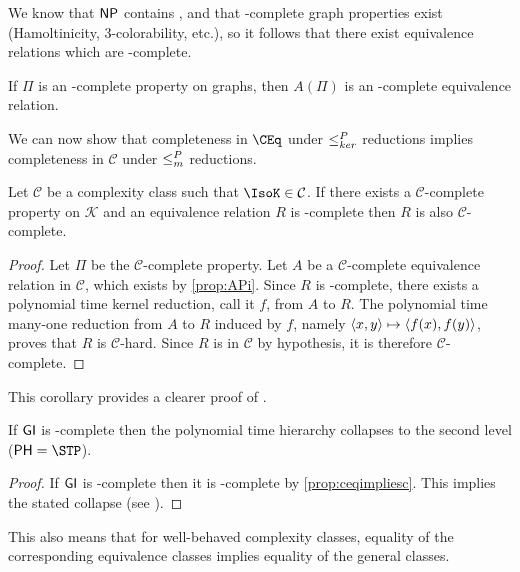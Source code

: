 We know that ${\mathsf{NP}}$ contains \GI, and that \NP-complete graph properties exist (Hamoltinicity, 3-colorability, etc.), so it follows that there exist equivalence relations which are \NP-complete.

\begin{corollary}\label{cor:npcompleteeqrel}
  If $\Pi$ is an \NP-complete property on graphs, then $A(\Pi)$ is an \NP-complete equivalence relation.
\end{corollary}

We can now show that completeness in $\CEq$ under $\leq^{P}_{ker}$ reductions implies completeness in $\mathcal{C}$ under $\leq^{P}_{m}$ reductions.

\begin{proposition}\label{prop:ceqimpliesc}
  Let $\mathcal{C}$ be a complexity class such that $\IsoK\in\mathcal{C}$.
  If there exists a $\mathcal{C}$-complete property on $\mathcal{K}$ and an equivalence relation $R$ is \CEq-complete then $R$ is also $\mathcal{C}$-complete.
\end{proposition}
\begin{proof}
  Let $\Pi$ be the $\mathcal{C}$-complete property.
  Let $A$ be a $\mathcal{C}$-complete equivalence relation in $\mathcal{C}$, which exists by \autoref{prop:APi}.
  Since $R$ is \CEq-complete, there exists a polynomial time kernel reduction, call it $f$, from $A$ to $R$.
  The polynomial time many-one reduction from $A$ to $R$ induced by $f$, namely $\left\langle x,y\right\rangle\mapsto\left\langle f(x),f(y)\right\rangle$, proves that $R$ is $\mathcal{C}$-hard.
  Since $R$ is in $\mathcal{C}$ by hypothesis, it is therefore $\mathcal{C}$-complete.
\end{proof}

This corollary provides a clearer proof of \autocite[Proposition~8.1]{bcffm}.

\begin{corollary}
  If ${\mathsf{GI}}$ is \NPEq-complete then the polynomial time hierarchy collapses to the second level ($\PH=\STP$).
\end{corollary}
\begin{proof}
  If ${\mathsf{GI}}$ is \NPEq-complete then it is \NP-complete by \autoref{prop:ceqimpliesc}.
  This implies the stated collapse (see \autocite{schoning87}).
\end{proof}

This also means that for well-behaved complexity classes, equality of the corresponding equivalence classes implies equality of the general classes.

